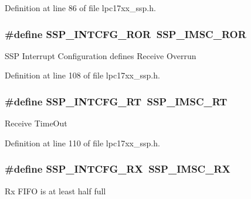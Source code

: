 \-Definition at line 86 of file lpc17xx\-\_\-ssp.\-h.

\hypertarget{group___s_s_p___public___macros_ga7db87dea06af8ba8368be4dcccfd97d3}{
\subsubsection[{\-S\-S\-P\-\_\-\-I\-N\-T\-C\-F\-G\-\_\-\-R\-O\-R}]{\setlength{\rightskip}{0pt plus 5cm}\#define {\bf \-S\-S\-P\-\_\-\-I\-N\-T\-C\-F\-G\-\_\-\-R\-O\-R}~{\bf \-S\-S\-P\-\_\-\-I\-M\-S\-C\-\_\-\-R\-O\-R}}}\label{group___s_s_p___public___macros_ga7db87dea06af8ba8368be4dcccfd97d3}
\-S\-S\-P \-Interrupt \-Configuration defines \-Receive \-Overrun 

\-Definition at line 108 of file lpc17xx\-\_\-ssp.\-h.

\hypertarget{group___s_s_p___public___macros_ga4716c2b633cc0698f6e515ffb7abedbd}{
\subsubsection[{\-S\-S\-P\-\_\-\-I\-N\-T\-C\-F\-G\-\_\-\-R\-T}]{\setlength{\rightskip}{0pt plus 5cm}\#define {\bf \-S\-S\-P\-\_\-\-I\-N\-T\-C\-F\-G\-\_\-\-R\-T}~{\bf \-S\-S\-P\-\_\-\-I\-M\-S\-C\-\_\-\-R\-T}}}\label{group___s_s_p___public___macros_ga4716c2b633cc0698f6e515ffb7abedbd}
\-Receive \-Time\-Out 

\-Definition at line 110 of file lpc17xx\-\_\-ssp.\-h.

\hypertarget{group___s_s_p___public___macros_ga20c9695e3dde083db7f54d6715c5573c}{
\subsubsection[{\-S\-S\-P\-\_\-\-I\-N\-T\-C\-F\-G\-\_\-\-R\-X}]{\setlength{\rightskip}{0pt plus 5cm}\#define {\bf \-S\-S\-P\-\_\-\-I\-N\-T\-C\-F\-G\-\_\-\-R\-X}~{\bf \-S\-S\-P\-\_\-\-I\-M\-S\-C\-\_\-\-R\-X}}}\label{group___s_s_p___public___macros_ga20c9695e3dde083db7f54d6715c5573c}
\-Rx \-F\-I\-F\-O is at least half full 

